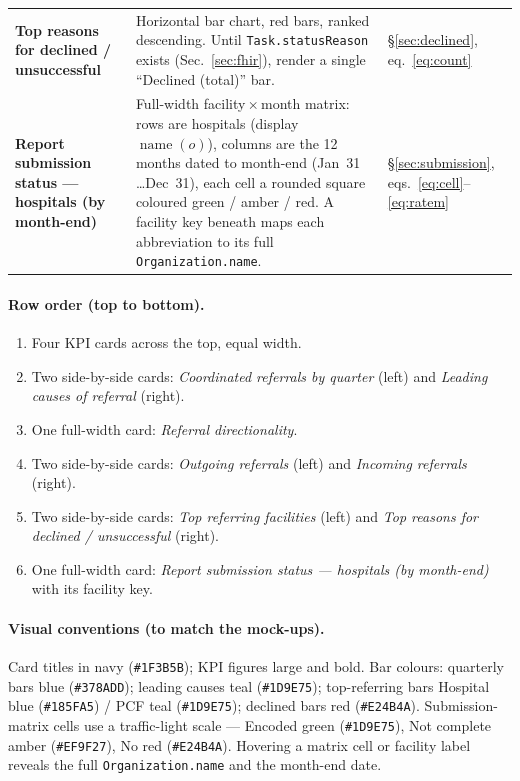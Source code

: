 \documentclass[11pt]{article}
\newcommand{\name}{\operatorname{name}}
\begin{document}
\begin{longtable}{>{\raggedright\arraybackslash}p{4.3cm} >{\raggedright\arraybackslash}p{6.4cm} >{\raggedright\arraybackslash}p{3.2cm}}
\textbf{Top reasons for declined / unsuccessful} & Horizontal bar chart, red bars, ranked descending. Until \texttt{Task.statusReason} exists (Sec.~\ref{sec:fhir}), render a single ``Declined (total)'' bar. & \S\ref{sec:declined}, eq.~\eqref{eq:count}\\
\textbf{Report submission status --- hospitals (by month-end)} & Full-width facility\,$\times$\,month matrix: rows are hospitals (display $\name(o)$), columns are the 12 months dated to month-end (Jan~31 \ldots Dec~31), each cell a rounded square coloured green / amber / red. A facility key beneath maps each abbreviation to its full \texttt{Organization.name}. & \S\ref{sec:submission}, eqs.~\eqref{eq:cell}--\eqref{eq:ratem}\\
\end{longtable}
\endgroup

\paragraph{Row order (top to bottom).}
\begin{enumerate}
  \item Four KPI cards across the top, equal width.
  \item Two side-by-side cards: \emph{Coordinated referrals by quarter} (left) and \emph{Leading causes of referral} (right).
  \item One full-width card: \emph{Referral directionality}.
  \item Two side-by-side cards: \emph{Outgoing referrals} (left) and \emph{Incoming referrals} (right).
  \item Two side-by-side cards: \emph{Top referring facilities} (left) and \emph{Top reasons for declined / unsuccessful} (right).
  \item One full-width card: \emph{Report submission status --- hospitals (by month-end)} with its facility key.
\end{enumerate}

\paragraph{Visual conventions (to match the mock-ups).} Card titles in navy (\texttt{\#1F3B5B}); KPI figures large and bold. Bar colours: quarterly bars blue (\texttt{\#378ADD}); leading causes teal (\texttt{\#1D9E75}); top-referring bars Hospital blue (\texttt{\#185FA5}) / PCF teal (\texttt{\#1D9E75}); declined bars red (\texttt{\#E24B4A}). Submission-matrix cells use a traffic-light scale --- Encoded green (\texttt{\#1D9E75}), Not complete amber (\texttt{\#EF9F27}), No red (\texttt{\#E24B4A}). Hovering a matrix cell or facility label reveals the full \texttt{Organization.name} and the month-end date.
\end{document}

